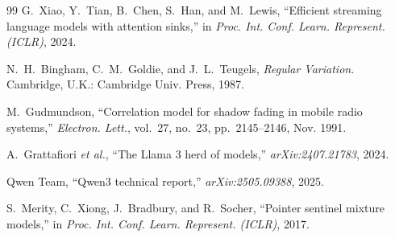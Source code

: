 \begin{thebibliography}{99}
 G.~Xiao, Y.~Tian, B.~Chen, S.~Han, and M.~Lewis, ``Efficient streaming language models with attention sinks,'' in \emph{Proc. Int. Conf. Learn. Represent. (ICLR)}, 2024.

 N.~H.~Bingham, C.~M.~Goldie, and J.~L.~Teugels, \emph{Regular Variation}. Cambridge, U.K.: Cambridge Univ. Press, 1987.

 M.~Gudmundson, ``Correlation model for shadow fading in mobile radio systems,'' \emph{Electron. Lett.}, vol.~27, no.~23, pp.~2145--2146, Nov. 1991.

 A.~Grattafiori \emph{et al.}, ``The Llama 3 herd of models,'' \emph{arXiv:2407.21783}, 2024.

 Qwen Team, ``Qwen3 technical report,'' \emph{arXiv:2505.09388}, 2025.

 S.~Merity, C.~Xiong, J.~Bradbury, and R.~Socher, ``Pointer sentinel mixture models,'' in \emph{Proc. Int. Conf. Learn. Represent. (ICLR)}, 2017.

\end{thebibliography}

